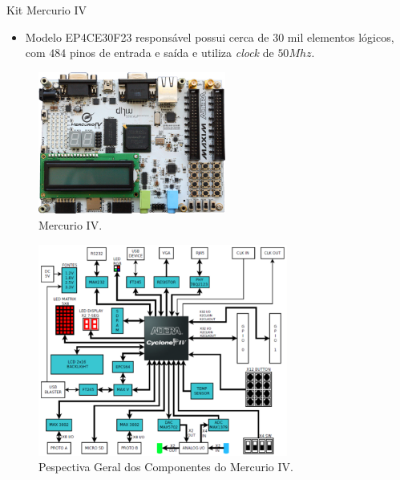 \documentclass[aspectratio=169]{beamer}
\begin{document}
	
	\begin{frame}{Kit Mercurio IV}
		\begin{itemize}
			\item Modelo EP4CE30F23 responsável possui cerca de $ 30 $ mil elementos lógicos, com $ 484 $ pinos de entrada e saída e utiliza \textit{clock} de $50Mhz$.
		\end{itemize}
		
		\begin{figure}[h]
			\centering
			\includegraphics[width=0.55\textwidth]{img/imobilis/mercurio-foto.jpg}
			\caption{Mercurio IV.}
			\label{fig:mercurio-foto}
		\end{figure}
	\end{frame}
	
	\begin{frame}%
		\begin{figure}[h]
			\centering
			\includegraphics[width=0.73\textwidth]{img/imobilis/mercurio-esquematico.png}
			\caption{Pespectiva Geral dos Componentes do Mercurio IV.}
			\label{fig:mercurio-esquematico}
		\end{figure}
	\end{frame}
	
\end{document}
